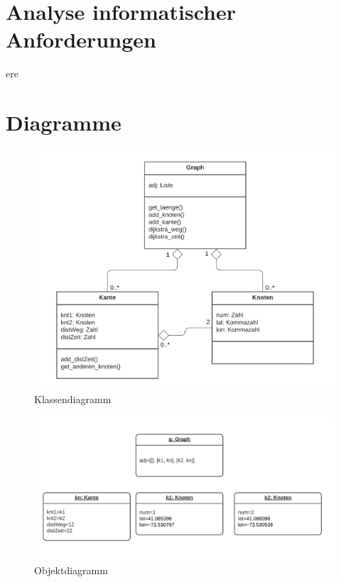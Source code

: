 \documentclass[a4paper,10pt,ngerman]{scrartcl}
\begin{document}
\section{Analyse informatischer Anforderungen}
ere

\newpage
\section{Diagramme}
\begin{figure}[!ht]
  \center
  \includegraphics[width=\textwidth]{Klassendiagramm.png}
  \vspace{-.5cm}
  \caption{Klassendiagramm}
\end{figure}

\begin{figure}[!ht]
  \center
  \includegraphics[width=\textwidth]{Objektdiagramm.png}
  \vspace{-1cm}
  \caption{Objektdiagramm}
\end{figure}
\end{document}
